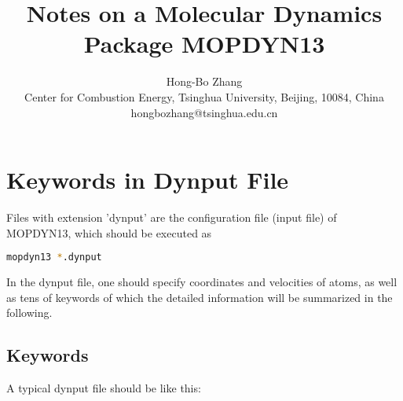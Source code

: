 \documentclass[11pt]{JHEP3}
\title{Notes on a Molecular Dynamics Package MOPDYN13}
\author{Hong-Bo Zhang\\
 Center for Combustion Energy, Tsinghua University, Beijing, 10084,
 China\\
 hongbozhang@tsinghua.edu.cn}
\begin{document}
\newpage
\section{Keywords in Dynput File}

Files with extension 'dynput' are the configuration file (input
file) of MOPDYN13, which should be executed as

\begin{lstlisting}[language=sh]
 mopdyn13 *.dynput
\end{lstlisting}

In the dynput file, one should specify coordinates and velocities of
atoms, as well as tens of keywords of which the detailed information
will be summarized in the following.

\subsection{Keywords}\label{sec:key}

A typical dynput file should be like this:


\end{document}
